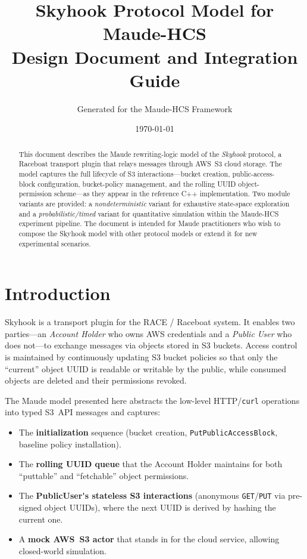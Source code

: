 \documentclass[11pt]{article}
\title{
  \textbf{Skyhook Protocol Model for Maude-HCS} \\[6pt]
  \large Design Document and Integration Guide
}
\author{Generated for the Maude-HCS Framework}
\date{\today}
\begin{document}
\maketitle

\begin{abstract}
This document describes the Maude rewriting-logic model of the
\emph{Skyhook} protocol, a Raceboat transport plugin that relays messages
through AWS~S3 cloud storage.  The model captures the full lifecycle
of S3 interactions---bucket creation, public-access-block configuration,
bucket-policy management, and the rolling UUID object-permission
scheme---as they appear in the reference C++ implementation.  Two
module variants are provided: a \emph{nondeterministic} variant for
exhaustive state-space exploration and a \emph{probabilistic/timed}
variant for quantitative simulation within the Maude-HCS experiment
pipeline.  The document is intended for Maude practitioners who wish to
compose the Skyhook model with other protocol models or extend it for
new experimental scenarios.
\end{abstract}

\tableofcontents
\newpage

\section{Introduction}\label{sec:intro}

Skyhook is a transport plugin for the RACE / Raceboat system.  It enables
two parties---an \emph{Account Holder} who owns AWS credentials and a
\emph{Public User} who does not---to exchange messages via objects stored
in S3 buckets.  Access control is maintained by continuously updating
S3 bucket policies so that only the ``current'' object UUID is readable
or writable by the public, while consumed objects are deleted and their
permissions revoked.

The Maude model presented here abstracts the low-level HTTP/\texttt{curl}
operations into typed S3~API messages and captures:

\begin{itemize}
  \item The \textbf{initialization} sequence (bucket creation,
        \texttt{PutPublicAccessBlock}, baseline policy installation).
  \item The \textbf{rolling UUID queue} that the Account Holder
        maintains for both ``puttable'' and ``fetchable'' object
        permissions.
  \item The \textbf{PublicUser\'{}s stateless S3 interactions}
        (anonymous \texttt{GET}/\texttt{PUT} via pre-signed object
        UUIDs), where the next UUID is derived by hashing the current
        one.
  \item A \textbf{mock AWS~S3 actor} that stands in for the cloud
        service, allowing closed-world simulation.
\end{itemize}
\end{document}
